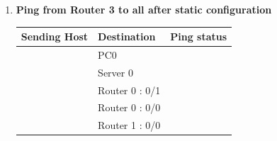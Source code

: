 \documentclass[a4paper,11pt]{article}
\begin{document}
\begin{enumerate}
\begin{enumerate}
              \item \textbf{Ping from Router 3 to all after static configuration}
                    \begin{table}[H]
                        \centering
                        \begin{tabular}{| m{9em}| m{12em}| m{9em} |}
                            \hline
                            \textbf{Sending Host}                                                & \textbf{Destination} & \textbf{Ping status}                                                     \\
                            \hline
                            {\cellcolor[rgb]{0.333,0.686,1}}                                     & PC0                  & {\cellcolor[rgb]{0.365,1,0.741}}                                         \\
                            \hhline{|>{\arrayrulecolor[rgb]{0.333,0.686,1}}->{\arrayrulecolor{black}}->{\arrayrulecolor[rgb]{0.365,1,0.741}}->{\arrayrulecolor{black}}|}
                            {\cellcolor[rgb]{0.333,0.686,1}}                                     & Server 0             & {\cellcolor[rgb]{0.365,1,0.741}}                                         \\
                            \hhline{|>{\arrayrulecolor[rgb]{0.333,0.686,1}}->{\arrayrulecolor{black}}->{\arrayrulecolor[rgb]{0.365,1,0.741}}->{\arrayrulecolor{black}}|}
                            {\cellcolor[rgb]{0.333,0.686,1}}                                     & Router 0 : 0/1       & {\cellcolor[rgb]{0.365,1,0.741}}                                         \\
                            \hhline{|>{\arrayrulecolor[rgb]{0.333,0.686,1}}->{\arrayrulecolor{black}}->{\arrayrulecolor[rgb]{0.365,1,0.741}}->{\arrayrulecolor{black}}|}
                            {\cellcolor[rgb]{0.333,0.686,1}}                                     & Router 0 : 0/0       & {\cellcolor[rgb]{0.365,1,0.741}}                                         \\
                            \hhline{|>{\arrayrulecolor[rgb]{0.333,0.686,1}}->{\arrayrulecolor{black}}->{\arrayrulecolor[rgb]{0.365,1,0.741}}->{\arrayrulecolor{black}}|}
                            {\cellcolor[rgb]{0.333,0.686,1}}                                     & Router 1 : 0/0       & {\cellcolor[rgb]{0.365,1,0.741}}                                         \\

\end{tabular}
\end{table}
\end{enumerate}
\end{enumerate}
\end{document}
